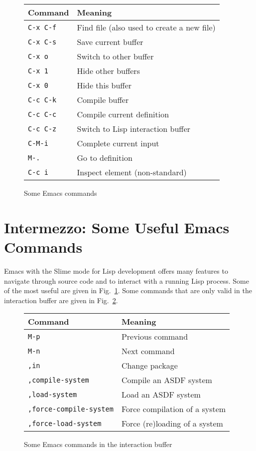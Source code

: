 \documentclass[a4paper]{amsart}
\begin{document}
\begin{figure}[tp]
  \centering
  \begin{tabular}{|l|l|}
    \hline
    Command & Meaning \\
    \hline\hline
    \texttt{C-x C-f} & Find file (also used to create a new file)\\
    \hline
    \texttt{C-x C-s} & Save current buffer\\
    \hline\hline
    \texttt{C-x o} & Switch to other buffer\\
    \hline
    \texttt{C-x 1} & Hide other buffers\\
    \hline
    \texttt{C-x 0} & Hide this buffer\\
    \hline\hline
    \texttt{C-c C-k} & Compile buffer\\
    \hline
    \texttt{C-c C-c} & Compile current definition\\
    \hline
    \texttt{C-c C-z} & Switch to Lisp interaction buffer\\
    \hline
    \texttt{C-M-i} & Complete current input\\
    \hline
    \texttt{M-.} & Go to definition\\
    \hline
    \texttt{C-c i} & Inspect element (non-standard)\\
    \hline
  \end{tabular}
  \caption{Some Emacs commands}
  \label{fig:emacs-commands}
\end{figure}

\section{Intermezzo: Some Useful Emacs Commands }
\label{sec:emacs}

Emacs with the Slime mode for Lisp development offers many features to
navigate through source code and to interact with a running Lisp
process.  Some of the most useful are given in
Fig.~\ref{fig:emacs-commands}.  Some commands that are only valid in
the interaction buffer are given in Fig.~\ref{fig:emacs-interaction}.

\begin{figure}[tp]
  \centering
  \begin{tabular}{|l|l|}
    \hline
    Command & Meaning \\
    \hline\hline
    \texttt{M-p} & Previous command\\
    \hline
    \texttt{M-n} & Next command\\
    \hline
    \texttt{,in} & Change package\\
    \hline
    \texttt{,compile-system} & Compile an ASDF system\\
    \hline
    \texttt{,load-system} & Load an ASDF system\\
    \hline
    \texttt{,force-compile-system} & Force compilation of a system\\
    \hline
    \texttt{,force-load-system} & Force (re)loading of a system\\
    \hline
  \end{tabular}
  \caption{Some Emacs commands in the interaction buffer}
  \label{fig:emacs-interaction}
\end{figure}
\end{document}
